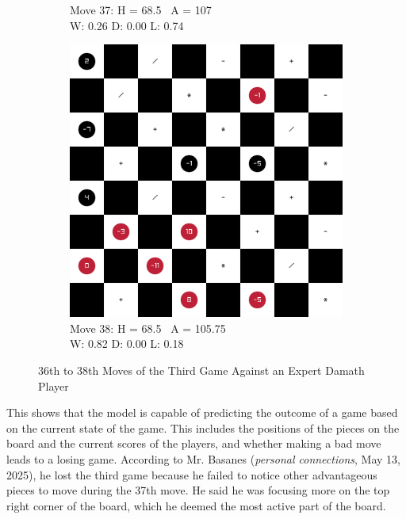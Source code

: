 \begin{figure}[H]
\begin{subfigure}{0.3\textwidth}
        \caption*{Move 37: H = 68.5 \textbar\ A = 107 \\ W: 0.26 D: 0.00 L: 0.74}
    \end{subfigure}
    \quad
    \begin{subfigure}{0.3\textwidth}
        \centering
        \includegraphics[width=\textwidth]{images/games/game3b/move_39.png}
        \caption*{Move 38: H = 68.5 \textbar\ A = 105.75 \\ W: 0.82 D: 0.00 L: 0.18}
    \end{subfigure}
    \caption{36th to 38th Moves of the Third Game Against an Expert Damath Player}
    \label{fig:36-38-game3b}
\end{figure}

This shows that the model is capable of predicting the outcome of a game based on the current state of the game. This includes the positions of the pieces on the board and the current scores of the players, and whether making a bad move leads to a losing game. According to Mr. Basanes (\textit{personal connections}, May 13, 2025), he lost the third game because he failed to notice other advantageous pieces to move during the 37th move. He said he was focusing more on the top right corner of the board, which he deemed the most active part of the board.


